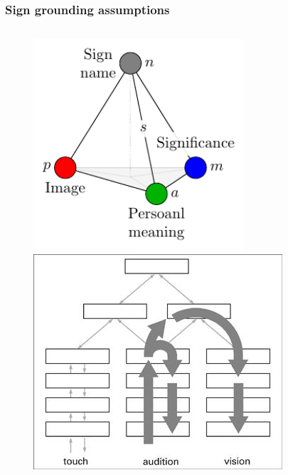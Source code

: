 \documentclass[default]{beamer}
\begin{document}
\begin{frame}
\begin{columns}
\begin{column}{0.65\textwidth}
			\end{column}
		\end{columns}
		\nocite{*}
		\printbibliography[keyword={column}, resetnumbers=true]
	\end{frame}
	
	\begin{frame}
		\frametitle{Sign grounding assumptions}
		
		\begin{columns}
			\begin{column}{0.3\textwidth}
				\begin{figure}
					\includegraphics[width=0.7\textwidth]{signs/sign_colored_en}
					\par\bigskip
					\includegraphics[width=\textwidth]{mpf/info_flow}

\end{figure}
\end{column}
\end{columns}
\end{frame}
\end{document}
